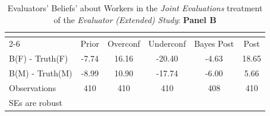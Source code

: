 \begin{table}[htbp]\centering
\caption{Evaluators' Beliefs' about Workers in the \textit{Joint Evaluations} treatment of the \textit{Evaluator (Extended) Study}: \textbf{Panel B}}
\begin{tabular}{l*{5}{c}}
\hline\hline
                &\multicolumn{5}{c}{}                             \\\cmidrule(lr){2-6}
                &\multicolumn{1}{c}{Prior}&\multicolumn{1}{c}{Overconf}&\multicolumn{1}{c}{Underconf}&\multicolumn{1}{c}{Bayes Post}&\multicolumn{1}{c}{Post}\\
\hline
B(F) - Truth(F) &    -7.74&    16.16&   -20.40&    -4.63&    18.65\\
B(M) - Truth(M) &    -8.99&    10.90&   -17.74&    -6.00&     5.66\\
\hline
Observations    &      410&      410&      410&      408&      410\\
\hline\hline
\multicolumn{6}{l}{\footnotesize SEs are robust}\\
\end{tabular}
\end{table}
